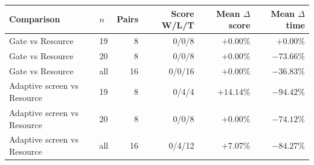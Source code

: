 \begin{tabular}{llrrrr}
\toprule
Comparison & $n$ & Pairs & Score W/L/T & Mean $\Delta$ score & Mean $\Delta$ time \\
\midrule
Gate vs Resource & 19 & 8 & 0/0/8 & $+0.00\%$ & $+0.00\%$ \\
Gate vs Resource & 20 & 8 & 0/0/8 & $+0.00\%$ & $-73.66\%$ \\
Gate vs Resource & all & 16 & 0/0/16 & $+0.00\%$ & $-36.83\%$ \\
Adaptive screen vs Resource & 19 & 8 & 0/4/4 & $+14.14\%$ & $-94.42\%$ \\
Adaptive screen vs Resource & 20 & 8 & 0/0/8 & $+0.00\%$ & $-74.12\%$ \\
Adaptive screen vs Resource & all & 16 & 0/4/12 & $+7.07\%$ & $-84.27\%$ \\
\bottomrule
\end{tabular}
